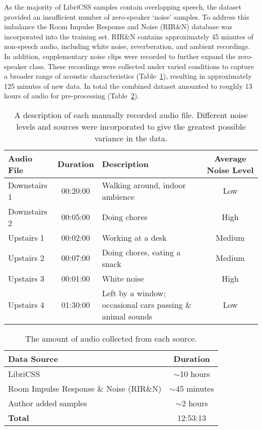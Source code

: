\noindent As the majority of LibriCSS samples contain overlapping speech, the dataset provided an insufficient number of zero-speaker `noise' samples. To address this imbalance the Room Impulse Response and Noise (RIR\&N) database \cite{RoomImpulseResponseDatabase} was incorporated into the training set. RIR\&N contains approximately 45 minutes of non-speech audio, including white noise, reverberation, and ambient recordings. In addition, supplementary noise clips were recorded to further expand the zero-speaker class. These recordings were collected under varied conditions to capture a broader range of acoustic characteristics (Table~\ref{tab:authordata}), resulting in approximately 125 minutes of new data. In total the combined dataset amounted to roughly 13 hours of audio for pre-processing (Table~\ref{tab:datacollection}).


\begin{table}[H]
  \centering
  \caption{A description of each manually recorded audio file. Different noise levels and sources were incorporated to give the greatest possible variance in the data.}
  \label{tab:authordata}
  \begin{tabular}{|l|c|l|c|}
    \hline
    \textbf{Audio File} & \textbf{Duration} & \textbf{Description} & \textbf{Average Noise Level}  \\
    \hline
    Downstairs 1 & 00:20:00 & Walking around, indoor ambience & Low \\
    \hline
    Downstairs 2 & 00:05:00 & Doing chores & High \\
    \hline
    Upstairs 1 & 00:02:00 & Working at a desk & Medium \\
    \hline
    Upstairs 2 & 00:07:00 & Doing chores, eating a snack & Medium \\
    \hline
    Upstairs 3 & 00:01:00 & White noise & High \\
    \hline
    Upstairs 4 & 01:30:00 & Left by a window; occasional cars passing \& animal sounds & Low \\
    \hline
  \end{tabular}
\end{table}


\begin{table}[H]
  \centering
  \caption{The amount of audio collected from each source.}
  \label{tab:datacollection}
  \begin{tabular}{|l|c|}
    \hline
    \textbf{Data Source} & \textbf{Duration}  \\
    \hline
    LibriCSS & $\sim$10 hours \\
    \hline
    Room Impulse Response \& Noise (RIR\&N) & $\sim$45 minutes \\
    \hline
    Author added samples & $\sim$2 hours \\
    \hline
    \textbf{Total} & 12:53:13 \\
    \hline
  \end{tabular}
\end{table}

